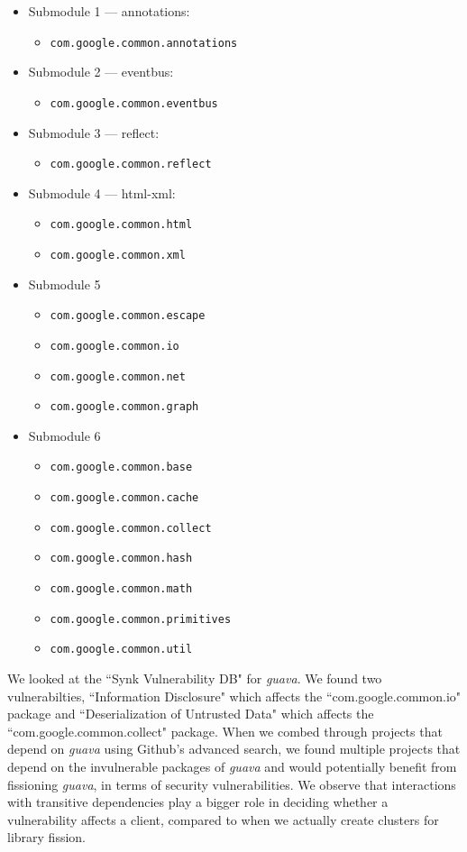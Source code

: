 \begin{itemize}
\item Submodule 1 --- annotations:
\begin{itemize}
\item \texttt{com.google.common.annotations}
\end{itemize}
\item Submodule 2 --- eventbus:
\begin{itemize}
\item \texttt{com.google.common.eventbus}
\end{itemize}
\item Submodule 3 --- reflect:
\begin{itemize}
\item \texttt{com.google.common.reflect}
\end{itemize}
\item Submodule 4 --- html-xml:
\begin{itemize}
\item \texttt{com.google.common.html}
\item \texttt{com.google.common.xml}
\end{itemize}
\item Submodule 5
\begin{itemize}
\item \texttt{com.google.common.escape}
\item \texttt{com.google.common.io}
\item \texttt{com.google.common.net}
\item \texttt{com.google.common.graph}
\end{itemize}
\item Submodule 6
\begin{itemize}
\item \texttt{com.google.common.base}
\item \texttt{com.google.common.cache}
\item \texttt{com.google.common.collect}
\item \texttt{com.google.common.hash}
\item \texttt{com.google.common.math}
\item \texttt{com.google.common.primitives}
\item \texttt{com.google.common.util}
\end{itemize}
\end{itemize}

We looked at the ``Synk Vulnerability DB" for \emph{guava}. We found two vulnerabilties, ``Information Disclosure" which affects the ``com.google.common.io" package and ``Deserialization of Untrusted Data" which affects the ``com.google.common.collect" package. When we combed through projects that depend on \emph{guava} using Github's advanced search, we found multiple projects that depend on the invulnerable packages of \emph{guava} and would potentially benefit from fissioning \emph{guava}, in terms of security vulnerabilities. We observe that interactions with transitive dependencies play a bigger role in deciding whether a vulnerability affects a client, compared to when we actually create clusters for library fission.

